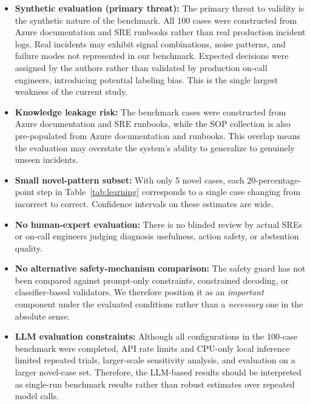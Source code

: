 \documentclass[a4paper,10pt,journal,compsoc]{IEEEtran}
\begin{document}
\begin{itemize}
\item \textbf{Synthetic evaluation (primary threat):} The primary
  threat to validity is the synthetic nature of the benchmark. All 100
  cases were constructed from Azure documentation and SRE runbooks
  rather than real production incident logs. Real incidents may exhibit
  signal combinations, noise patterns, and failure modes not
  represented in our benchmark. Expected decisions were assigned by the
  authors rather than validated by production on-call engineers,
  introducing potential labeling bias. This is the single largest
  weakness of the current study.

\item \textbf{Knowledge leakage risk:} The benchmark cases were
  constructed from Azure documentation and SRE runbooks, while the SOP
  collection is also pre-populated from Azure documentation and
  runbooks. This overlap means the evaluation may overstate the
  system's ability to generalize to genuinely unseen incidents.

\item \textbf{Small novel-pattern subset:} With only 5 novel cases,
  each 20-percentage-point step in Table~\ref{tab:learning}
  corresponds to a single case changing from incorrect to correct.
  Confidence intervals on these estimates are wide.

\item \textbf{No human-expert evaluation:} There is no blinded review
  by actual SREs or on-call engineers judging diagnosis usefulness,
  action safety, or abstention quality.

\item \textbf{No alternative safety-mechanism comparison:} The safety
  guard has not been compared against prompt-only constraints,
  constrained decoding, or classifier-based validators. We therefore
  position it as an \emph{important} component under the evaluated
  conditions rather than a \emph{necessary} one in the absolute sense.

\item \textbf{LLM evaluation constraints:} Although all configurations
  in the 100-case benchmark were completed, API rate limits and
  CPU-only local inference limited repeated trials, larger-scale
  sensitivity analysis, and evaluation on a larger novel-case set.
  Therefore, the LLM-based results should be interpreted as single-run
  benchmark results rather than robust estimates over repeated model
  calls.


\end{itemize}
\end{document}

